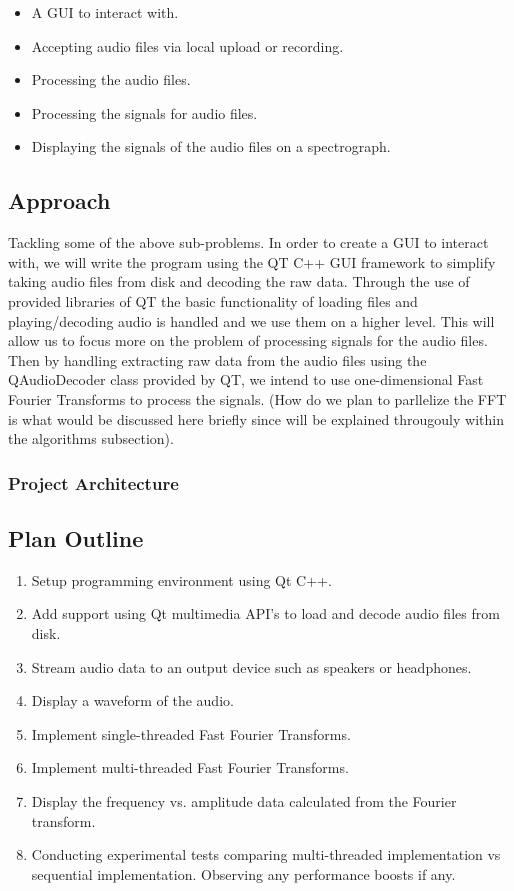 \documentclass[journal]{IEEEtran}
\begin{document}
\begin{itemize}
	\item A GUI to interact with.
	\item Accepting audio files via local upload or recording.
	\item Processing the audio files.
	\item Processing the signals for audio files.
	\item Displaying the signals of the audio files on a spectrograph.
\end{itemize}

\subsection{Approach}
	\par Tackling some of the above sub-problems. In order to create a GUI to interact with, we will write the program using the QT C++ GUI framework to simplify taking audio files from disk and decoding the raw data. Through the use of provided libraries of QT the basic functionality of loading files and playing/decoding audio is handled and we use them on a higher level. This will allow us to focus more on the problem of processing signals for the audio files. Then by handling extracting raw data from the audio files using the QAudioDecoder class provided by QT, we intend to use one-dimensional Fast Fourier Transforms to process the signals. (How do we plan to parllelize the FFT is what would be discussed here briefly since will be explained througouly within the algorithms subsection).
\subsubsection{Project Architecture}


\subsection{Plan Outline}

\begin{enumerate}
	\item Setup programming environment using Qt C++.
	\item Add support using Qt multimedia API's to load and decode audio files from disk.
	\item Stream audio data to an output device such as speakers or headphones.
	\item Display a waveform of the audio.
	\item Implement single-threaded Fast Fourier Transforms.
	\item Implement multi-threaded Fast Fourier Transforms.
	\item Display the frequency vs. amplitude data calculated from the Fourier transform.
	\item Conducting experimental tests comparing multi-threaded implementation vs sequential implementation. 
Observing any performance boosts if any.
\end{enumerate}
\end{document}
